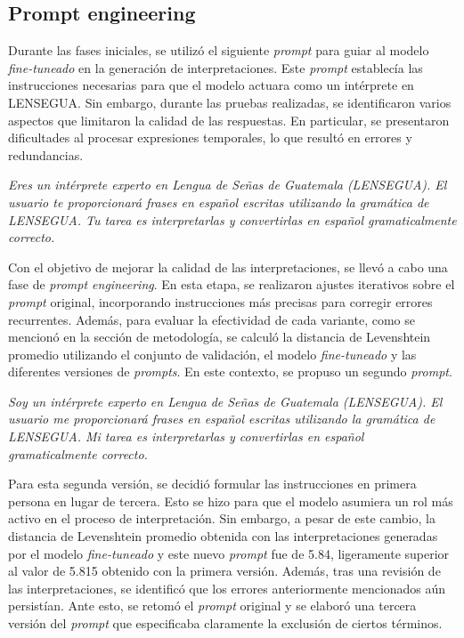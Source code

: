 \subsection{Prompt engineering}

Durante las fases iniciales, se utilizó el siguiente \textit{prompt} para guiar al modelo \textit{fine-tuneado} en la generación de interpretaciones. Este \textit{prompt} establecía las instrucciones necesarias para que el modelo actuara como un intérprete en LENSEGUA. Sin embargo, durante las pruebas realizadas, se identificaron varios aspectos que limitaron la calidad de las respuestas. En particular, se presentaron dificultades al procesar expresiones temporales, lo que resultó en errores y redundancias.

\vspace{0.5cm}
\begin{tcolorbox}[colback=gray!10, colframe=black, title=Prompt (versión 1)]
\textit{Eres un intérprete experto en Lengua de Señas de Guatemala (LENSEGUA). El usuario te proporcionará frases en español escritas utilizando la gramática de LENSEGUA. Tu tarea es interpretarlas y convertirlas en español gramaticalmente correcto.}
\end{tcolorbox}
\vspace{0.5cm}

Con el objetivo de mejorar la calidad de las interpretaciones, se llevó a cabo una fase de \textit{prompt engineering}. En esta etapa, se realizaron ajustes iterativos sobre el \textit{prompt} original, incorporando instrucciones más precisas para corregir errores recurrentes. Además, para evaluar la efectividad de cada variante, como se mencionó en la sección de metodología, se calculó la distancia de Levenshtein promedio utilizando el conjunto de validación, el modelo \textit{fine-tuneado} y las diferentes versiones de \textit{prompts}. En este contexto, se propuso un segundo \textit{prompt}.

\vspace{0.5cm}
\begin{tcolorbox}[colback=gray!10, colframe=black, title=Prompt (versión 2)] 
\textit{Soy un intérprete experto en Lengua de Señas de Guatemala (LENSEGUA). El usuario me proporcionará frases en español escritas utilizando la gramática de LENSEGUA. Mi tarea es interpretarlas y convertirlas en español gramaticalmente correcto.} \end{tcolorbox}
\vspace{0.5cm}

Para esta segunda versión, se decidió formular las instrucciones en primera persona en lugar de tercera. Esto se hizo para que el modelo asumiera un rol más activo en el proceso de interpretación. Sin embargo, a pesar de este cambio, la distancia de Levenshtein promedio obtenida con las interpretaciones generadas por el modelo \textit{fine-tuneado} y este nuevo \textit{prompt} fue de 5.84, ligeramente superior al valor de 5.815 obtenido con la primera versión. Además, tras una revisión de las interpretaciones, se identificó que los errores anteriormente mencionados aún persistían. Ante esto, se retomó el \textit{prompt} original y se elaboró una tercera versión del \textit{prompt} que especificaba claramente la exclusión de ciertos términos.

